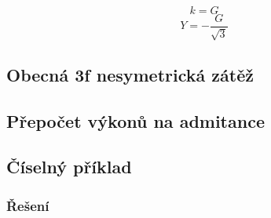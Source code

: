 \documentclass{article}
\begin{document}
$$
    k = G
$$
$$
    Y = -\frac{G}{\sqrt{3}}
$$


\subsection{Obecná 3f nesymetrická zátěž \spicy \spicy \spicy}


\subsection{Přepočet výkonů na admitance}


\subsection{Číselný příklad}

\subsubsection{Řešení}
\end{document}
